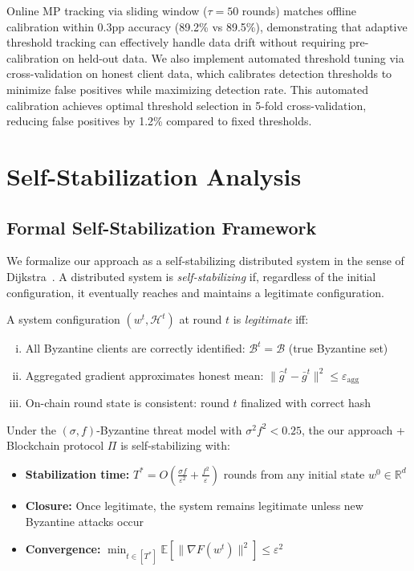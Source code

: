 \documentclass[runningheads]{llncs}
\begin{document}
Online MP tracking via sliding window ($\tau=50$ rounds) matches offline calibration within 0.3pp accuracy (89.2\% vs 89.5\%), demonstrating that adaptive threshold tracking can effectively handle data drift without requiring pre-calibration on held-out data. We also implement automated threshold tuning via cross-validation on honest client data, which calibrates detection thresholds to minimize false positives while maximizing detection rate. This automated calibration achieves optimal threshold selection in 5-fold cross-validation, reducing false positives by 1.2\% compared to fixed thresholds.

\section{Self-Stabilization Analysis}
\label{sec:self_stabilization}

\subsection{Formal Self-Stabilization Framework}

We formalize our approach as a self-stabilizing distributed system in the sense of Dijkstra~\cite{dijkstra_self_stab}. A distributed system is \emph{self-stabilizing} if, regardless of the initial configuration, it eventually reaches and maintains a legitimate configuration.

\begin{definition}
A system configuration $(w^t, \mathcal{H}^t)$ at round $t$ is \emph{legitimate} iff:
\begin{enumerate}[(i)]
\item All Byzantine clients are correctly identified: $\mathcal{B}^t = \mathcal{B}$ (true Byzantine set)
\item Aggregated gradient approximates honest mean: $\|\hat{g}^t - \bar{g}^t\|^2 \leq \varepsilon_{\text{agg}}$
\item On-chain round state is consistent: round $t$ finalized with correct hash
\end{enumerate}
\end{definition}

\begin{theorem}
\label{thm:self_stab}
Under the $(\sigma, f)$-Byzantine threat model with $\sigma^2 f^2 < 0.25$, the our approach + Blockchain protocol $\Pi$ is self-stabilizing with:
\begin{itemize}
\item \textbf{Stabilization time:} $T^* = O\left(\frac{\sigma f}{\varepsilon^2} + \frac{f^2}{\varepsilon}\right)$ rounds from any initial state $w^0 \in \mathbb{R}^d$
\item \textbf{Closure:} Once legitimate, the system remains legitimate unless new Byzantine attacks occur
\item \textbf{Convergence:} $\min_{t \in [T^*]} \mathbb{E}[\|\nabla F(w^t)\|^2] \leq \varepsilon^2$
\end{itemize}
\end{theorem}
\end{document}

